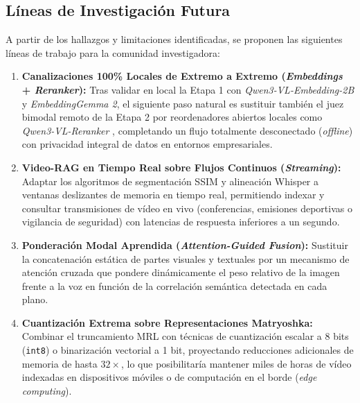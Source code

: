 \subsection{Líneas de Investigación Futura}
\label{subsec:lineas_investigacion_futura}

A partir de los hallazgos y limitaciones identificadas, se proponen las siguientes líneas de trabajo para la comunidad investigadora:

\begin{enumerate}
    \item \textbf{Canalizaciones 100\% Locales de Extremo a Extremo (\textit{Embeddings} + \textit{Reranker}):} Tras validar en local la Etapa 1 con \textit{Qwen3-VL-Embedding-2B} y \textit{EmbeddingGemma 2}, el siguiente paso natural es sustituir también el juez bimodal remoto de la Etapa 2 por reordenadores abiertos locales como \textit{Qwen3-VL-Reranker} \cite{qwen3_vl_emb2026}, completando un flujo totalmente desconectado (\textit{offline}) con privacidad integral de datos en entornos empresariales.
    \item \textbf{Video-RAG en Tiempo Real sobre Flujos Continuos (\textit{Streaming}):} Adaptar los algoritmos de segmentación SSIM y alineación Whisper a ventanas deslizantes de memoria en tiempo real, permitiendo indexar y consultar transmisiones de vídeo en vivo (conferencias, emisiones deportivas o vigilancia de seguridad) con latencias de respuesta inferiores a un segundo.
    \item \textbf{Ponderación Modal Aprendida (\textit{Attention-Guided Fusion}):} Sustituir la concatenación estática de partes visuales y textuales por un mecanismo de atención cruzada que pondere dinámicamente el peso relativo de la imagen frente a la voz en función de la correlación semántica detectada en cada plano.
    \item \textbf{Cuantización Extrema sobre Representaciones Matryoshka:} Combinar el truncamiento MRL con técnicas de cuantización escalar a 8 bits (\texttt{int8}) o binarización vectorial a 1 bit, proyectando reducciones adicionales de memoria de hasta $32\times$, lo que posibilitaría mantener miles de horas de vídeo indexadas en dispositivos móviles o de computación en el borde (\textit{edge computing}).
\end{enumerate}
